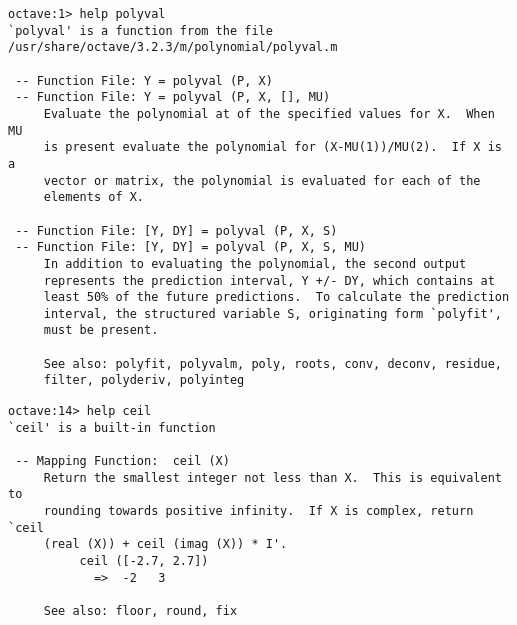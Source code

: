 \begin{lstlisting}
octave:1> help polyval
`polyval' is a function from the file /usr/share/octave/3.2.3/m/polynomial/polyval.m

 -- Function File: Y = polyval (P, X)
 -- Function File: Y = polyval (P, X, [], MU)
     Evaluate the polynomial at of the specified values for X.  When MU
     is present evaluate the polynomial for (X-MU(1))/MU(2).  If X is a
     vector or matrix, the polynomial is evaluated for each of the
     elements of X.

 -- Function File: [Y, DY] = polyval (P, X, S)
 -- Function File: [Y, DY] = polyval (P, X, S, MU)
     In addition to evaluating the polynomial, the second output
     represents the prediction interval, Y +/- DY, which contains at
     least 50% of the future predictions.  To calculate the prediction
     interval, the structured variable S, originating form `polyfit',
     must be present.

     See also: polyfit, polyvalm, poly, roots, conv, deconv, residue,
     filter, polyderiv, polyinteg
\end{lstlisting}

\begin{lstlisting}
octave:14> help ceil
`ceil' is a built-in function

 -- Mapping Function:  ceil (X)
     Return the smallest integer not less than X.  This is equivalent to
     rounding towards positive infinity.  If X is complex, return `ceil
     (real (X)) + ceil (imag (X)) * I'.
          ceil ([-2.7, 2.7])
            =>  -2   3

     See also: floor, round, fix
\end{lstlisting}
